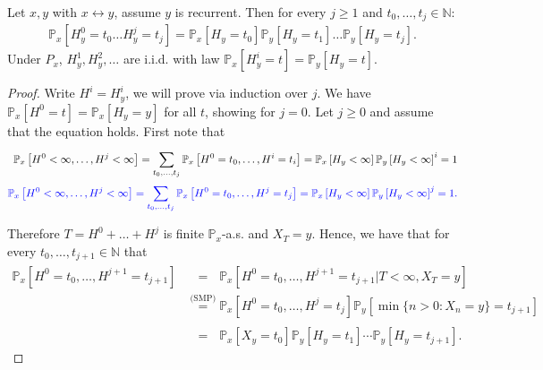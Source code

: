 \begin{lemma}[]
	Let $x,y$ with $x \leftrightarrow y$, assume $y$ is recurrent. Then for every $j \geq 1$ and $t_0, \ldots, t_j \in \mathbb{N}$:
\begin{align}
	\mathbb{P}_{x} \left[ H_y^0=t_0 \ldots H_y^j=t_j \right] = \mathbb{P}_{x} \left[ H_y=t_0 \right] \mathbb{P}_{y} \left[ H_y=t_1 \right]  \ldots  \mathbb{P}_{y} \left[ H_y=t_j \right] 
.\end{align}
Under $P_x$, $H_y^1,H_y^2, \ldots $ are i.i.d. with law $\mathbb{P}_{x} \left[ H_y^i=t \right] = \mathbb{P}_{y} \left[ H_y=t \right] $.
\end{lemma}
\begin{proof}
	Write $H^i = H_y^i$, we will prove via induction over $j$. We have $\mathbb{P}_{x} \left[ H^0 = t \right]  = \mathbb{P}_{x} \left[ H_y = y \right] $ for all $t$, showing for $j=0$.
Let $j\geq 0$ and assume that the equation holds. First note that 
	\begin{align}
	\mathbb{P}_{x} \left[ H^0 < \infty, \ldots, H^j < \infty \right] = \sum_{t_0,\ldots, t_j}^{} \mathbb{P}_{x} \left[ H^0 = t_0, \ldots, H^i=t_i \right] = \mathbb{P}_{x} \left[ H_y < \infty \right] \mathbb{P}_{y} \left[ H_y < \infty \right] ^i = 1 \\
	\color{blue} \mathbb{P}_{x} \left[ H^0 < \infty, \ldots, H^j < \infty \right] = \sum_{t_0,\ldots, t_j}^{} \mathbb{P}_{x} \left[ H^0 = t_0, \ldots, H^j=t_j \right] = \mathbb{P}_{x} \left[ H_y < \infty \right] \mathbb{P}_{y} \left[ H_y < \infty \right] ^j = 1.
	\end{align}

	Therefore $T = H^0 + \ldots + H^j$ is finite $\mathbb{P}_{x} $-a.s. and $X_T=y$. Hence, we have that for every $t_0,\ldots,t_{j+1} \in \mathbb{N}$ that
	\begin{align}
		\mathbb{P}_{x} \left[ H^0=t_0,\ldots,H^{j+1}=t_{j+1} \right] &\stackrel{\phantom{\textrm{(SMP)}}}{=} \mathbb{P}_{x} \left[ H^0 = t_0, \ldots, H^{j+1}=t_{j+1} | T<\infty, X_T = y \right]  \\
		&\stackrel{\textrm{(SMP)}}{=} \mathbb{P}_{x} \left[ H^0=t_0, \ldots, H^j=t_j \right] \mathbb{P}_{y} \left[ \min\{n> 0: X_n =y\} = t_{j+1} \right] \\ 
	&\stackrel{\phantom{\textrm{(SMP)}}}{=} \mathbb{P}_{x} \left[ X_y = t_0 \right] \mathbb{P}_{y} \left[ H_y = t_1 \right] \cdots \mathbb{P}_{y} \left[ H_y = t_{j+1} \right]  
	.\end{align}
\end{proof}

